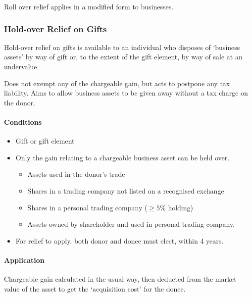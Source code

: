 \documentclass[
]{article}
\providecommand{\tightlist}{%
  \setlength{\itemsep}{0pt}\setlength{\parskip}{0pt}}
\begin{document}
Roll over relief applies in a modified form to businesses.

\hypertarget{hold-over-relief-on-gifts}{%
\subsubsection{Hold-over Relief on
Gifts}\label{hold-over-relief-on-gifts}}

Hold-over relief on gifts is available to an individual who disposes of
`business assets' by way of gift or, to the extent of the gift element,
by way of sale at an undervalue.

Does not exempt any of the chargeable gain, but acts to postpone any tax
liability. Aims to allow business assets to be given away without a tax
charge on the donor.

\hypertarget{conditions-1}{%
\paragraph{Conditions}\label{conditions-1}}

\begin{itemize}
\tightlist
\item
  Gift or gift element
\item
  Only the gain relating to a chargeable business asset can be held
  over.

  \begin{itemize}
  \tightlist
  \item
    Assets used in the donor's trade
  \item
    Shares in a trading company not listed on a recognised exchange
  \item
    Shares in a personal trading company (\(\geq 5\%\) holding)
  \item
    Assets owned by shareholder and used in personal trading company.
  \end{itemize}
\item
  For relief to apply, both donor and donee must elect, within 4 years.
\end{itemize}

\hypertarget{application-1}{%
\paragraph{Application}\label{application-1}}

Chargeable gain calculated in the usual way, then deducted from the
market value of the asset to get the `acquisition cost' for the donee.
\end{document}
